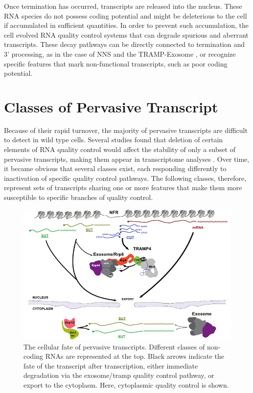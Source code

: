 Once termination has occurred, transcripts are released into the nucleus. 
These RNA species do not possess coding potential and might be deleterious to the cell if accumulated in sufficient quantities. 
In order to prevent such accumulation, the cell evolved RNA quality control systems that can degrade spurious and aberrant transcripts. 
These decay pathways can be directly connected to termination and 3’ processing, as in the case of NNS and the TRAMP-Exosome \cite{thiebaut:2006:transcription}, or recognize specific features that mark non-functional transcripts, such as poor coding potential.

\section{Classes of Pervasive Transcript} \label{pervasiveTranscripts}

Because of their rapid turnover, the majority of pervasive transcripts are difficult to detect in wild type cells. 
Several studies found that deletion of certain elements of RNA quality control would affect the stability of only a subset of pervasive transcripts, making them appear in transcriptome analyses \cite{wyers:2005:cryptic, vandijk:2011:xuts}. 
Over time, it became obvious that several classes exist, each responding differently to inactivation of specific quality control pathways. 
The following classes, therefore, represent sets of transcripts sharing one or more features that make them more susceptible to specific branches of quality control.

\begin{figure}[ht]

\centering
\includegraphics[width=\textwidth]{figures/introduction/pervasiveTr}
\caption[Classes of transcripts and their fates.]{The cellular fate of pervasive transcripts. Different classes of non-coding RNAs are represented at the top. Black arrows indicate the fate of the transcript after transcription, either immediate degradation via the exosome/\gls{tramp} quality control pathway, or export to the cytoplasm. Here, cytoplasmic quality control is shown.}
\label{fig:pervasiveTranscripts}

\end{figure}


